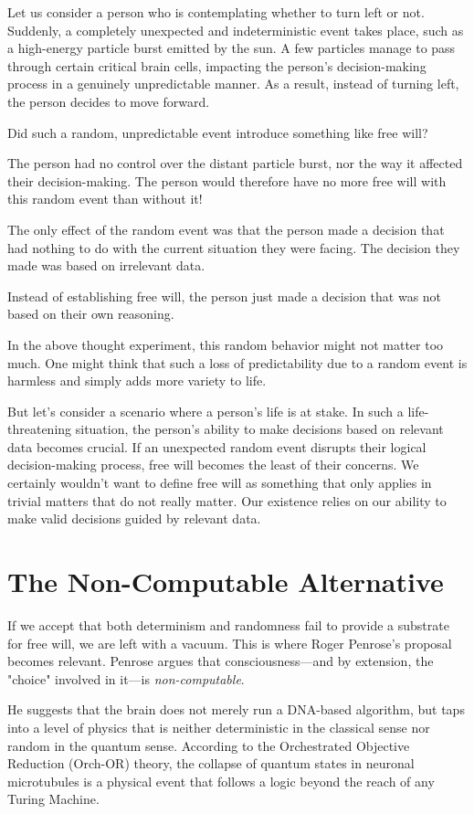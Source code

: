 Let us consider a person who is contemplating whether to turn left
or not. Suddenly, a completely unexpected and indeterministic
event takes place, such as a high-energy particle burst emitted by
the sun. A few particles manage to pass through certain critical
brain cells, impacting the person's decision-making process in a genuinely unpredictable manner. As a result, instead of turning
left, the person decides to move forward. 

Did such a random, unpredictable event introduce something like free will?  
  
The person had no control over the distant particle burst, nor the way it affected
their decision-making. The person would therefore have no more free will with
this random event than without it!

The only effect of the random event was that the person made
a decision that had nothing to do with the current situation they
were facing. The decision they made was based on irrelevant data.


Instead of establishing free will, the person just made 
a decision that was not based on their own reasoning.
  
In the above thought experiment, this random behavior might not
matter too much. One might think that such a loss of predictability due to a random event is harmless and simply adds more variety to life.  
 
But let's consider a scenario where a person's life is at stake. 
In such a life-threatening situation, the person's
ability to make decisions based on relevant data becomes crucial. If an unexpected random event disrupts their logical
decision-making process, free will becomes the least of their
concerns. We certainly wouldn't want to define free will as
something that only applies in trivial matters that do not
really matter. Our existence relies on our ability to make valid decisions 
guided by relevant data. 


\section{The Non-Computable Alternative}

If we accept that both determinism and randomness fail to provide a substrate for free will, we are left with a vacuum.
This is where Roger Penrose's proposal becomes relevant. Penrose argues that consciousness—and by extension, the "choice" involved in it—is \textit{non-computable}. 

He suggests that the brain does not merely run a DNA-based algorithm, but taps into a level of physics that is neither deterministic in the classical
sense nor random in the quantum sense. According to the Orchestrated Objective Reduction (Orch-OR) theory, the collapse of quantum states in
neuronal microtubules is a physical event that follows a logic beyond the reach of any Turing Machine.

